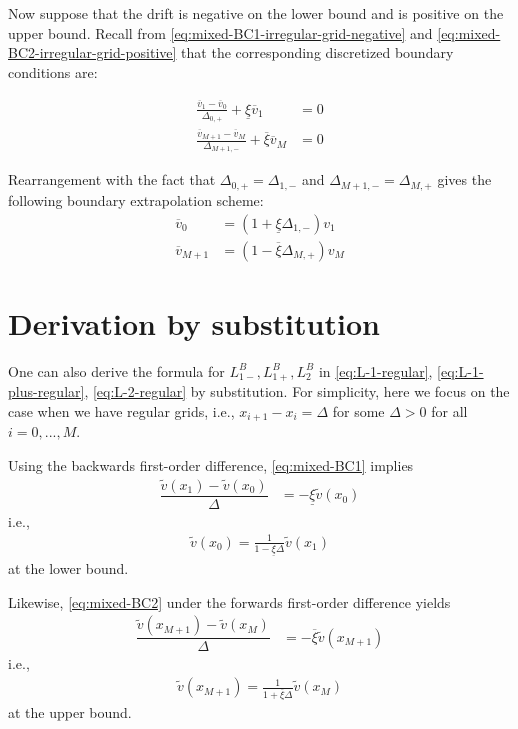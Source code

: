 \documentclass[11pt]{article}
\theoremstyle{definition}
\begin{document}
Now suppose that the drift is negative on the lower bound and is positive on the upper bound. Recall from \eqref{eq:mixed-BC1-irregular-grid-negative} and \eqref{eq:mixed-BC2-irregular-grid-positive} that the corresponding discretized boundary conditions are:

\begin{align}
\frac{\overline{v}_1 - \overline{v}_0}{\Delta_{0,+}} + \underline{\xi} \overline{v}_1 &= 0 \\
\frac{\overline{v}_{M+1} - \overline{v}_M}{\Delta_{M+1,-}} + \overline{\xi} \overline{v}_{M} &= 0 
\end{align}

Rearrangement with the fact that $\Delta_{0,+} = \Delta_{1,-}$ and $\Delta_{M+1,-} = \Delta_{M,+}$ gives the following boundary extrapolation scheme:
\begin{align}
\overline{v}_0 &= (1+\underline{\xi} \Delta_{1,-} ) {v}_1 \\
\overline{v}_{M+1} &= (1-\overline{\xi} \Delta_{M,+} ) {v}_M
\end{align}

\section{Derivation by substitution}
One can also derive the formula for $L_{1-}^B, L_{1+}^B, L_2^B$ in \eqref{eq:L-1-regular}, \eqref{eq:L-1-plus-regular}, \eqref{eq:L-2-regular} by substitution. For simplicity, here we focus on the case when we have regular grids, i.e., $x_{i+1} - x_i = \Delta$ for some $\Delta > 0$ for all $i = 0, ..., M$.

Using the backwards first-order difference, \eqref{eq:mixed-BC1} implies
\begin{align}
\dfrac{\tilde{v}({x_{1}}) - \tilde{v}(x_{0})}{\Delta} &= - \underline{\xi} \tilde{v}({x_{0}})
\end{align}
i.e.,
\begin{align}\label{eq:BC1-extrapolation-uniform}
\tilde{v}(x_0) = \frac{1}{1-\underline{\xi} \Delta } \tilde{v}(x_1)
\end{align}
at the lower bound.

Likewise, \eqref{eq:mixed-BC2} under the forwards first-order difference yields
\begin{align}
\dfrac{\tilde{v}(x_{M+1}) - \tilde{v}({x_{M}})}{\Delta} &= - \overline{\xi} \tilde{v}({x_{M+1} })
\end{align}
i.e.,
\begin{align}\label{eq:BC2-extrapolation-uniform}
\tilde{v}(x_{M+1}) = \frac{1}{1+\overline{\xi} \Delta } \tilde{v}(x_M)
\end{align}
at the upper bound.
\end{document}
